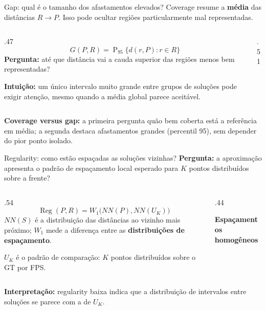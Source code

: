 \begin{frame}{Gap: qual é o tamanho dos afastamentos elevados?}
Coverage resume a \textbf{média} das distâncias $R\to P$. Isso pode ocultar regiões particularmente mal representadas.
\begin{columns}[T,onlytextwidth]
\begin{column}{.47\textwidth}
\[
\boxed{\displaystyle
G(P,R)=\operatorname{P}_{95}\{d(r,P):r\in R\}}
\]
\textbf{Pergunta:} até que distância vai a cauda superior das regiões menos bem representadas?
\par\medskip
\textbf{Intuição:} um único intervalo muito grande entre grupos de soluções pode exigir atenção, mesmo quando a média global parece aceitável.
\end{column}
\begin{column}{.51\textwidth}\centering
{}
\FairLegend
\end{column}
\end{columns}
\vspace{.10cm}\textbf{Coverage versus gap:} a primeira pergunta quão bem coberta está a referência em média; a segunda destaca afastamentos grandes (percentil 95), sem depender do pior ponto isolado.
\end{frame}

\begin{frame}{Regularity: como estão espaçadas as soluções vizinhas?}
\textbf{Pergunta:} a aproximação apresenta o padrão de espaçamento local esperado para $K$ pontos distribuídos sobre a frente?
\begin{columns}[T,onlytextwidth]
\begin{column}{.54\textwidth}
\[
\boxed{\displaystyle
\operatorname{Reg}(P,R)=W_1\bigl(NN(P),NN(U_K)\bigr)}
\]
$NN(S)$ é a distribuição das distâncias ao vizinho mais próximo; $W_1$ mede a diferença entre as \textbf{distribuições de espaçamento}.
\par\medskip
$U_K$ é o padrão de comparação: $K$ pontos distribuídos sobre o GT por FPS.
\end{column}
\begin{column}{.44\textwidth}\centering
{}
\textbf{Espaçamentos homogêneos}
\end{column}
\end{columns}
\vspace{.17cm}
\textbf{Interpretação:} regularity baixa indica que a distribuição de intervalos entre soluções se parece com a de $U_K$.
\end{frame}

